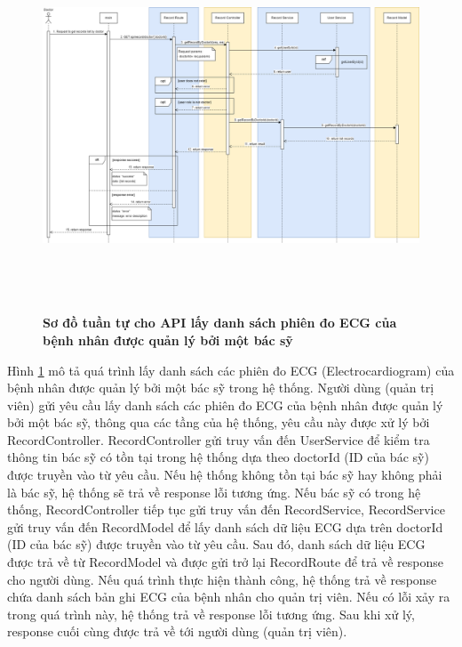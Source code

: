  \begin{figure}[H]
  \centering
  \includegraphics[width=16cm,height=11cm]{Images/sequence_api/getRecordsByDoctor.png}
  \caption[Sơ đồ tuần tự cho API lấy danh sách phiên đo ECG của bệnh nhân được quản lý bởi một bác sỹ ]{\bfseries \fontsize{12pt}{0pt}
  \selectfont Sơ đồ tuần tự cho API lấy danh sách phiên đo ECG của bệnh nhân được quản lý bởi một bác sỹ}
  \label{getRecordsByDoctor} %
\end{figure}
Hình \ref{getRecordsByDoctor} mô tả quá trình lấy danh sách các phiên đo ECG (Electrocardiogram) của bệnh nhân được quản lý bởi một bác sỹ trong hệ thống. Người dùng (quản trị viên) gửi yêu cầu lấy danh sách các phiên đo ECG của bệnh nhân được quản lý bởi một bác sỹ, 
thông qua các tầng của hệ thống, yêu cầu này được xử lý bởi RecordController. RecordController gửi truy vấn đến UserService để kiểm tra thông tin bác sỹ có tồn tại trong hệ thống dựa theo doctorId (ID của bác sỹ) được truyền vào từ yêu cầu. Nếu hệ thống không tồn tại bác sỹ hay không phải là bác sỹ, hệ thống sẽ
trả về response lỗi tương ứng. Nếu bác sỹ có trong hệ thống, RecordController tiếp tục gửi truy vấn đến RecordService, RecordService gửi truy vấn đến RecordModel để lấy danh sách dữ liệu ECG dựa trên doctorId (ID của bác sỹ) được truyền vào từ yêu cầu. 
Sau đó, danh sách dữ liệu ECG được trả về từ RecordModel và được gửi trở lại RecordRoute để trả về response cho người dùng. Nếu quá trình thực hiện thành công, hệ thống trả về response chứa danh sách bản ghi ECG của bệnh nhân cho quản trị viên. Nếu có lỗi xảy ra
 trong quá trình này, hệ thống trả về response lỗi tương ứng. Sau khi xử lý, response cuối cùng được trả về tới người dùng (quản trị viên).

